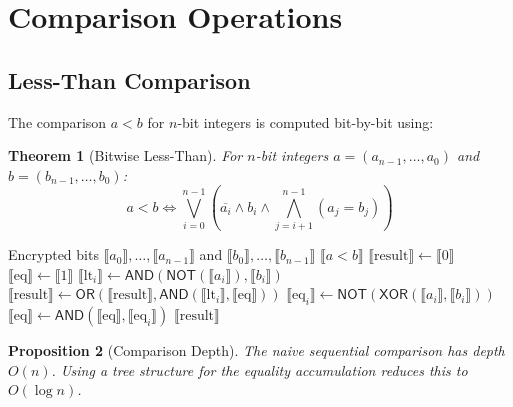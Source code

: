 \documentclass[11pt,a4paper]{article}
\newtheorem{theorem}{Theorem}[section]
\newtheorem{proposition}[theorem]{Proposition}
\begin{document}
\section{Comparison Operations}

\subsection{Less-Than Comparison}

The comparison $a < b$ for $n$-bit integers is computed bit-by-bit using:

\begin{theorem}[Bitwise Less-Than]
For $n$-bit integers $a = (a_{n-1}, \ldots, a_0)$ and $b = (b_{n-1}, \ldots, b_0)$:
\begin{equation}
a < b \iff \bigvee_{i=0}^{n-1} \left( \overline{a_i} \land b_i \land \bigwedge_{j=i+1}^{n-1} (a_j = b_j) \right)
\end{equation}
\end{theorem}

\begin{algorithm}
\caption{Homomorphic Less-Than Comparison}
\begin{algorithmic}[1]
\Require Encrypted bits $\llbracket a_0 \rrbracket, \ldots, \llbracket a_{n-1} \rrbracket$ and $\llbracket b_0 \rrbracket, \ldots, \llbracket b_{n-1} \rrbracket$
\Ensure $\llbracket a < b \rrbracket$
\State $\llbracket \text{result} \rrbracket \gets \llbracket 0 \rrbracket$
\State $\llbracket \text{eq} \rrbracket \gets \llbracket 1 \rrbracket$ 
    \State $\llbracket \text{lt}_i \rrbracket \gets \textsf{AND}(\textsf{NOT}(\llbracket a_i \rrbracket), \llbracket b_i \rrbracket)$ 
    \State $\llbracket \text{result} \rrbracket \gets \textsf{OR}(\llbracket \text{result} \rrbracket, \textsf{AND}(\llbracket \text{lt}_i \rrbracket, \llbracket \text{eq} \rrbracket))$
    \State $\llbracket \text{eq}_i \rrbracket \gets \textsf{NOT}(\textsf{XOR}(\llbracket a_i \rrbracket, \llbracket b_i \rrbracket))$ 
    \State $\llbracket \text{eq} \rrbracket \gets \textsf{AND}(\llbracket \text{eq} \rrbracket, \llbracket \text{eq}_i \rrbracket)$
\EndFor
\State \Return $\llbracket \text{result} \rrbracket$
\end{algorithmic}
\end{algorithm}

\begin{proposition}[Comparison Depth]
The naive sequential comparison has depth $O(n)$. Using a tree structure for the equality accumulation reduces this to $O(\log n)$.
\end{proposition}
\end{document}
